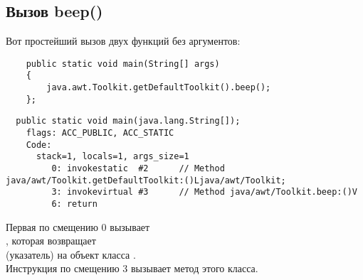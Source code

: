 \subsection{Вызов beep()}

Вот простейший вызов двух функций без аргументов:

\begin{lstlisting}
	public static void main(String[] args)
	{
		java.awt.Toolkit.getDefaultToolkit().beep();
	};
\end{lstlisting}

\begin{lstlisting}
  public static void main(java.lang.String[]);
    flags: ACC_PUBLIC, ACC_STATIC
    Code:
      stack=1, locals=1, args_size=1
         0: invokestatic  #2      // Method java/awt/Toolkit.getDefaultToolkit:()Ljava/awt/Toolkit;
         3: invokevirtual #3      // Method java/awt/Toolkit.beep:()V
         6: return        
\end{lstlisting}

Первая  по смещению 0 вызывает\\
, 
которая возвращает\\
 (указатель) на объект класса .\\

Инструкция  по смещению 3 вызывает метод  этого класса.
